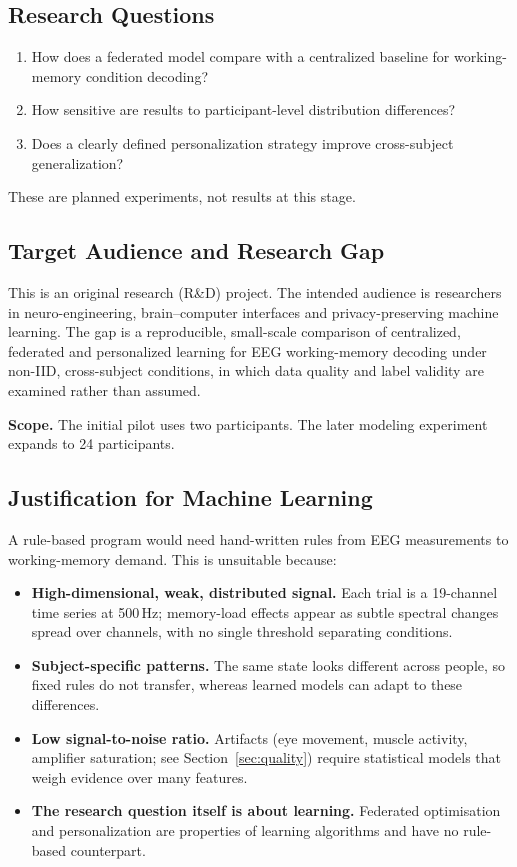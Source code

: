 \documentclass[11pt,a4paper]{article}
\begin{document}
\subsection{Research Questions}
\begin{enumerate}[leftmargin=*]
  \item How does a federated model compare with a centralized baseline for working-memory condition decoding?
  \item How sensitive are results to participant-level distribution differences?
  \item Does a clearly defined personalization strategy improve cross-subject generalization?
\end{enumerate}
These are planned experiments, not results at this stage.

\subsection{Target Audience and Research Gap}
This is an original research (R\&D) project. The intended audience is researchers in neuro-engineering,
brain--computer interfaces and privacy-preserving machine learning. The gap is a reproducible, small-scale comparison
of centralized, federated and personalized learning for EEG working-memory decoding under non-IID, cross-subject
conditions, in which data quality and label validity are examined rather than assumed.

\textbf{Scope.} The initial pilot uses two participants. The later modeling experiment expands to 24 participants.

\subsection{Justification for Machine Learning}
A rule-based program would need hand-written rules from EEG measurements to working-memory demand. This is unsuitable
because:
\begin{itemize}[leftmargin=*]
  \item \textbf{High-dimensional, weak, distributed signal.} Each trial is a 19-channel time series at 500\,Hz;
  memory-load effects appear as subtle spectral changes spread over channels, with no single threshold separating
  conditions.
  \item \textbf{Subject-specific patterns.} The same state looks different across people, so fixed rules do not transfer,
  whereas learned models can adapt to these differences.
  \item \textbf{Low signal-to-noise ratio.} Artifacts (eye movement, muscle activity, amplifier saturation; see
  Section~\ref{sec:quality}) require statistical models that weigh evidence over many features.
  \item \textbf{The research question itself is about learning.} Federated optimisation and personalization are
  properties of learning algorithms and have no rule-based counterpart.
\end{itemize}
\end{document}
